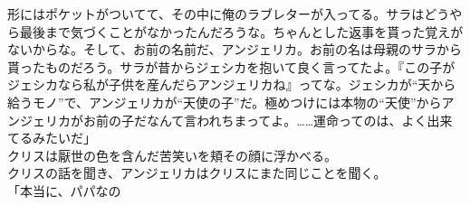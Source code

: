\documentclass[b5j,10pt,openany]{jsbook}
\begin{document}
形にはポケットがついてて、その中に俺のラブレターが入ってる。サラはどうやら最後まで気づくことがなかったんだろうな。ちゃんとした返事を貰った覚えがないからな。そして、お前の名前だ、アンジェリカ。お前の名は母親のサラから貰ったものだろう。サラが昔からジェシカを抱いて良く言ってたよ。『この子がジェシカなら私が子供を産んだらアンジェリカね』ってな。ジェシカが``天から給うモノ''で、アンジェリカが``天使の子''だ。極めつけには本物の``天使''からアンジェリカがお前の子だなんて言われちまってよ。\ldots{}\ldots{}運命ってのは、よく出来てるみたいだ」\\クリスは厭世の色を含んだ苦笑いを頬その顔に浮かべる。\\クリスの話を聞き、アンジェリカはクリスにまた同じことを聞く。\\「本当に、パパなの\ldot
\end{document}
